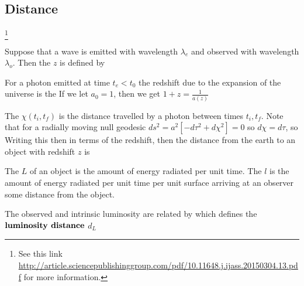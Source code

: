 \documentclass{article}
\begin{document}
\subsection{Distance}\footnote{See this link \href{http://article.sciencepublishinggroup.com/pdf/10.11648.j.ijass.20150304.13.pdf}{http://article.sciencepublishinggroup.com/pdf/10.11648.j.ijass.20150304.13.pdf} for more information. }

\begin{definition}[Redshift]
Suppose that a wave is emitted with wavelength $\lambda_e$ and observed with wavelength $ \lambda_o$. Then the  $z$ is defined by 
\end{definition}

\begin{definition}
For a photon emitted at time $t_e < t_0$ the redshift due to the expansion of the universe is the 
If we let $a_0=1$, then we get $1+z = \frac{1}{a(z)}$
\end{definition}

\begin{definition}
The  $\chi(t_i,t_f)$ is the distance travelled by a photon between times $t_i,t_f$. Note that for a radially moving null geodesic $ds^2 = a^2[-d\tau^2 + d\chi^2] = 0$ so $d\chi=d\tau$, so 
Writing this then in terms of the redshift, then the distance from the earth to an object with redshift $z$ is   
\end{definition}

\begin{definition}[Luminosity]
The  $L$ of an object is the amount of energy radiated per unit time. The  $l$ is the amount of energy radiated per unit time per unit surface arriving at an observer some distance from the object.
\end{definition}

\begin{definition}
The observed and intrinsic luminosity are related by 
which defines the $\textbf{luminosity distance}$ $d_L$
 \end{definition}
 
\end{document}

